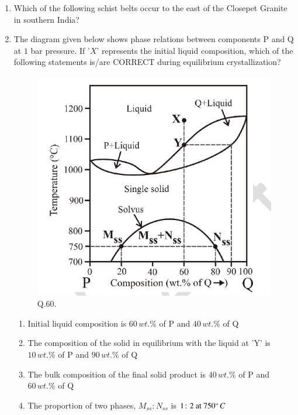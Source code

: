 \documentclass[journal,12pt,onecolumn]{IEEEtran}
\theoremstyle{remark}
\begin{document}
\begin{enumerate}
\item Which of the following schist belts occur to the east of the Closepet Granite in southern India?
\begin{enumerate}
\end{enumerate}
\hfill{}
\newpage
\item The diagram given below shows phase relations between components P and Q at $1$ bar pressure. If '$X$' represents the initial liquid composition, which of the following statements is/are CORRECT during equilibrium crystallization?
\begin{figure}[H]
    \centering
    \includegraphics[width=0.6\columnwidth]{Figs/fig_8.png}
    \caption{Q.60.}
    \label{fig:q60}
\end{figure}
\begin{enumerate}
    \item Initial liquid composition is $60\,wt.\%$ of P and $40\,wt.\%$ of Q
    \item The composition of the solid in equilibrium with the liquid at 'Y' is $10\,wt.\%$ of P and $90\,wt.\%$ of Q
    \item The bulk composition of the final solid product is $40\,wt.\%$ of P and $60\,wt.\%$ of Q
    \item The proportion  of two phases, $M_{ss} \colon N_{ss}$ is $1 \colon 2 \text{ at } 750 \degree\,C$
\end{enumerate}
\hfill{}


\end{enumerate}
\end{document}
